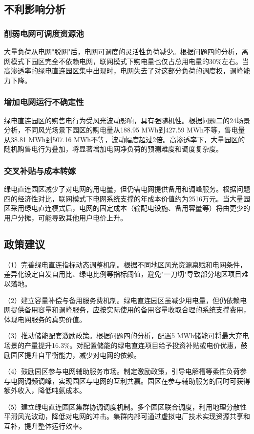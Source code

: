 \subsection{不利影响分析}

\subsubsection{削弱电网可调度资源池}

大量负荷从电网"脱网"后，电网可调度的灵活性负荷减少。根据问题四的分析，离网模式下园区完全不依赖电网，联网模式下购电量也仅占总用电量的30\%左右。当高渗透率的绿电直连园区集中出现时，电网失去了对这部分负荷的调度权，调峰能力下降。

\subsubsection{增加电网运行不确定性}

绿电直连园区的购售电行为受风光波动影响，具有强随机性。根据问题二的24场景分析，不同风光场景下园区的购电量从188.95 MWh到427.59 MWh不等，售电量从38.81 MWh到507.16 MWh不等，波动幅度超过2倍。高渗透率下，大量园区的随机购售电行为叠加，将显著增加电网净负荷的预测难度和调度复杂度。

\subsubsection{交叉补贴与成本转嫁}

绿电直连园区减少了对电网的用电量，但仍需电网提供备用和调峰服务。根据问题四的经济性对比，联网模式下电网系统支撑的年成本价值约为2516万元。当大量园区采用绿电直连模式后，电网的固定成本（输配电设施、备用容量等）将由更少的用户分摊，可能导致其他用户电价上升。

\subsection{政策建议}

（1）完善绿电直连指标动态调整机制。根据不同地区风光资源禀赋和电网条件，差异化设定自发自用比、绿电比例等指标阈值，避免"一刀切"导致部分地区项目难以落地。

（2）建立容量补偿与备用服务费机制。绿电直连园区虽减少用电量，但仍依赖电网提供备用容量和调峰服务，应按实际使用的备用容量收取合理的系统支撑费用，体现电网服务的真实价值。

（3）推动储能配套激励政策。根据问题四的分析，配置5 MWh储能可将最大弃电场景的产量提升16.3\%。对配置储能的绿电直连项目给予投资补贴或电价优惠，鼓励园区提升自平衡能力，减少对电网的依赖。

（4）鼓励园区参与电网辅助服务市场。制定激励政策，引导电解槽等柔性负荷参与电网调频调峰，实现园区与电网的互利共赢。园区在参与辅助服务的同时可获得额外收入\cite{ref7}，降低吨氨成本。

（5）建立绿电直连园区集群协调调度机制。多个园区联合调度，利用地理分散性平滑风光波动，降低对电网的冲击。集群内部可通过虚拟电厂技术实现资源共享和互补，提升整体运行效率。
